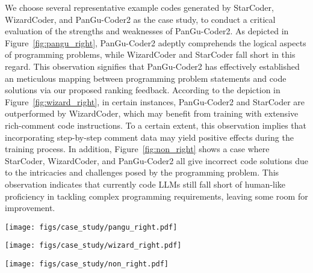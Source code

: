 \documentclass{article}
\newcommand{\pgcoder}{PanGu-Coder2\xspace}
\begin{document}
We choose several representative example codes generated by StarCoder, WizardCoder, and \pgcoder as the case study, to conduct a critical evaluation of the strengths and weaknesses of \pgcoder.
As depicted in Figure~\ref{fig:pangu_right}, \pgcoder adeptly comprehends the logical aspects of programming problems, while WizardCoder and StarCoder fall short in this regard.
This observation signifies that \pgcoder has effectively established an meticulous mapping between programming problem statements and code solutions via our proposed ranking feedback.
According to the depiction in Figure~\ref{fig:wizard_right}, in certain instances, \pgcoder and StarCoder are outperformed by WizardCoder, which may benefit from training with extensive rich-comment code instructions.
To a certain extent, this observation implies that incorporating step-by-step comment data may yield positive effects during the training process.
In addition, 
Figure~\ref{fig:non_right} shows a case where StarCoder, WizardCoder, and \pgcoder all give incorrect code solutions due to the intricacies and challenges posed by the programming problem.
This observation indicates that currently code LLMs still fall short of human-like proficiency in tackling complex programming requirements, leaving some room for improvement.

\begin{figure*}[hbp]
  \centering
  \texttt{[image: figs/case\_study/pangu\_right.pdf]}
  \caption{A HumanEval case of \pgcoder surpassing WizardCoder and StarCoder.}
\label{fig:pangu_right}
\end{figure*}

\begin{figure*}[tp]
  \centering
  \texttt{[image: figs/case\_study/wizard\_right.pdf]}
  \caption{A HumanEval case of WizardCoder surpassing \pgcoder and StarCoder.}
\label{fig:wizard_right}
\end{figure*}

\begin{figure*}[tp]
  \centering
  \texttt{[image: figs/case\_study/non\_right.pdf]}
  \caption{A HumanEval case where \pgcoder, WizardCoder, and StarCoder all generate incorrect outputs.}
\label{fig:non_right}
\end{figure*}
\end{document}
